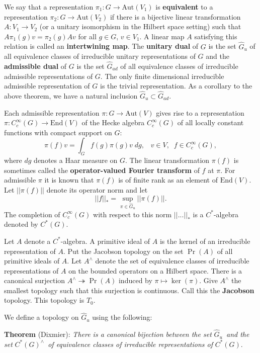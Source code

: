\documentclass[11pt, a4paper]{article}
\begin{document}
We say that a representation $\pi _1:G\rightarrow \mathrm{Aut}(V_1)$ is {\bf %
equivalent} to a representation $\pi _2:G\rightarrow \mathrm{Aut}(V_2)$ if there is a
bijective linear transformation $A:V_1\rightarrow V_2$ (or a unitary isomorphism in the Hilbert space setting) such that $A\pi
_1(g)v=\pi _2(g)Av$ for all $g\in G$, $v\in V_1$. A linear map $A$ satisfying this relation is called an 
{\bf intertwining map}. The {\bf unitary dual} of $G$ is the set $\hat G_u$
of all equivalence classes of irreducible unitary representations of $G$ and
the {\bf admissible dual} of $G$ is the set $\hat G_{ad}$ of all equivalence
classes of irreducible admissible representations of $G$. The only finite
dimensional irreducible admissible representation of $G$ is the trivial
representation. As a corollary to the above theorem, we have a natural
inclusion $\hat G_u\subset \hat G_{ad}$.

Each admissible representation $\pi :G\rightarrow \mathrm{Aut}(V)$ gives rise to a
representation $\pi :C_c^\infty (G)\rightarrow \mathrm{End}(V)$ of the
Hecke algebra $C_c^\infty (G)$ of all locally constant functions with
compact support on $G$:
\[
\pi (f)v=\int_Gf(g)\pi (g)v\;dg,\;\;\;v\in V,\;\;f\in C_c^\infty (G),
\]
where $dg$ denotes a Haar measure on $G$. The linear transformation $\pi (f)$
is sometimes called the {\bf operator-valued Fourier transform} of $f$ at $%
\pi $. For admissible $\pi $ it is known that $\pi (f)$ is of finite rank as an
element of $\mathrm{End}(V)$. Let $||\pi (f)||$ denote its operator norm and let
\[
||f||_{*}=\sup_{\pi \in \hat G_u}||\pi (f)||.
\]
The completion of $C_c^\infty (G)$ with respect to this norm $||...||_{*}$
is a $C^{*}$-algebra denoted by $C^{*}(G)$.

Let $A$ denote a $C^{*}$-algebra. A primitive ideal of $A$ is the kernel of
an irreducible representation of $A$. Put the Jacobson topology on the set $%
\Pr (A)$ of all primitive ideals of $A$. Let $A^{\wedge }$ denote the set of
equivalence classes of irreducible representations of $A$ on the bounded
operators on a Hilbert space. There is a canonical surjection $A^{\wedge
}\twoheadrightarrow \Pr (A)$ induced by $\pi \longmapsto \ker (\pi )$. Give $%
A^{\wedge }$ the smallest topology such that this surjection is continuous.
Call this the {\bf Jacobson} topology. This topology is $T_0$.

We define a topology on $\hat G_u$ using the following:

{\bf Theorem} (Dixmier): {\em There is a canonical bijection between the set 
}$\hat G_u${\em \ and the set }$C^{*}(G)^{\wedge }${\em \ of equivalence
classes of irreducible representations of }$C^{*}(G)$.
\end{document}
